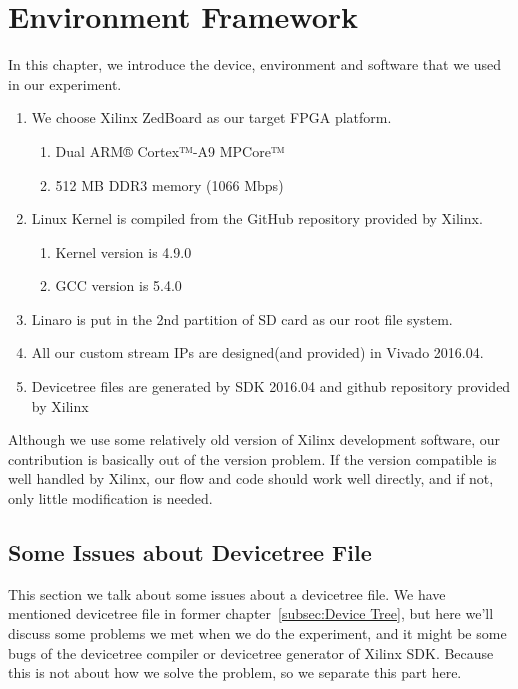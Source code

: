 \chapter{Environment Framework}
\label{cha:Environment Framework}

In this chapter, we introduce the device, environment and software that we used in our experiment. 


\begin{enumerate}[label=(\roman*)]
\item We choose Xilinx ZedBoard as our target FPGA platform.
	\begin{enumerate}
	\item Dual ARM® Cortex™-A9 MPCore™
	\item 512 MB DDR3 memory (1066 Mbps)
	\end{enumerate}
\item Linux Kernel is compiled from the GitHub repository provided by Xilinx.\cite{xlnxkernel}
	\begin{enumerate}
	\item Kernel version is 4.9.0
	\item GCC version is 5.4.0
	\end{enumerate}
\item Linaro\cite{linarofs} is put in the 2nd partition of SD card as our root file system.
\item All our custom stream IPs are designed(and provided) in Vivado 2016.04.
\item Devicetree files are generated by SDK 2016.04 and github repository provided by Xilinx\cite{xlnxdevicetree}
\end{enumerate}

Although we use some relatively old version of Xilinx development software, our contribution is basically out of the version problem. If the version compatible is well handled by Xilinx, our flow and code should work well directly, and if not, only little modification is needed.

\newpage
\section{Some Issues about Devicetree File}
\label{sec:Some Issues about Devicetree File}
This section we talk about some issues about a devicetree file. We have mentioned devicetree file in former chapter~\ref{subsec:Device Tree}, but here we'll discuss some problems we met when we do the experiment, and it might be some bugs of the devicetree compiler or devicetree generator of Xilinx SDK. Because this is not about how we solve the problem, so we separate this part here.

